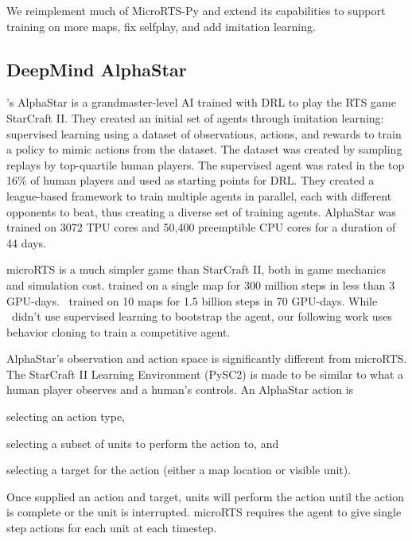 \documentclass{article}
\begin{document}
We reimplement much of MicroRTS-Py and extend its capabilities to support training on
more maps, fix selfplay, and add imitation learning.

\subsection{DeepMind AlphaStar}
\citet{Vinyals2019GrandmasterLI}'s AlphaStar is a grandmaster-level AI trained with DRL to play the RTS game
StarCraft II. They created an initial set of agents through imitation learning: supervised learning
using a dataset of observations, actions, and rewards to train a policy to mimic actions
from the dataset. The dataset was created by sampling replays by top-quartile human
players. The supervised agent was rated in the top 16\% of human players and used as
starting points for DRL. They created a league-based framework to train multiple agents
in parallel, each with different opponents to beat, thus creating a diverse set of
training agents. AlphaStar was trained on 3072 TPU cores and 50,400 preemptible CPU
cores for a duration of 44 days.

microRTS is a much simpler game than StarCraft II, both in game mechanics and simulation
cost. \citet{DBLP:journals/corr/abs-2105-13807} trained on a single map for 300 million
steps in less than 3 GPU-days. \agentName\ trained on 10 maps for 1.5 billion steps in
70 GPU-days. While \agentName\ didn't use supervised learning to bootstrap the agent,
our following work uses behavior cloning to train a competitive agent.

AlphaStar's observation and action space is significantly different from microRTS. The
StarCraft II Learning Environment (PySC2) is made to be similar to what a human player
observes and a human's controls. An AlphaStar action is 
\begin{inparaenum}[(1)]
    \item selecting an action type,
    \item selecting a subset of units to perform the action to, and
    \item selecting a target for the action (either a map location or visible unit).
\end{inparaenum}
Once supplied an action and target, units will perform the action until the action is complete or the unit is interrupted.
microRTS requires the agent to give single step actions for each unit at each timestep.
\end{document}

